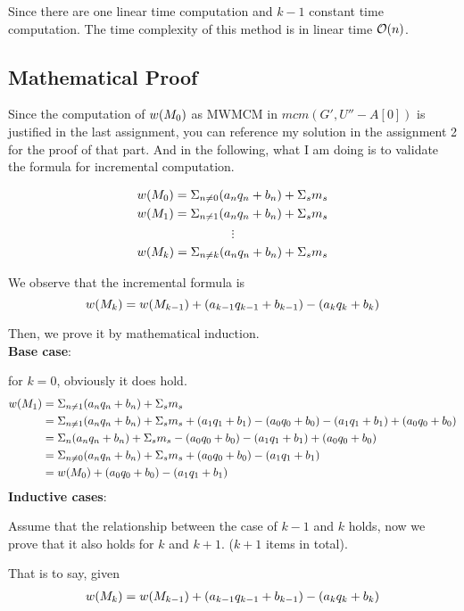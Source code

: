 \documentclass[11pt,a4paper]{article}
\begin{document}
Since there are one linear time computation and $k-1$ constant time
computation. The time complexity of this method is in linear time
$\mathcal{O}(n)$.

\newpage
\subsection{Mathematical Proof}
Since the computation of $w(M_{0})$ as MWMCM in $mcm(G', U''-A[0])$ is justified
in the last assignment, you can reference my solution in the assignment 2 for
the proof of that part. And in the following, what I am doing is to validate
the formula for incremental computation. 

\begin{align*}
    w(M_{0}) = \Sigma_{n \neq 0} (a_n q_n + b_n) + \Sigma_s m_s \\
    w(M_{1}) = \Sigma_{n \neq 1} (a_n q_n + b_n) + \Sigma_s m_s 
\end{align*}
$$
\vdots 
$$
\begin{align*}
    w(M_{k}) = \Sigma_{n \neq k} (a_n q_n + b_n) + \Sigma_s m_s
\end{align*}

We observe that the incremental formula is 
    $$
    w(M_{k}) = w(M_{k-1}) + (a_{k-1} q_{k-1} + b_{k-1}) - (a_{k} q_{k} + b_{k})
    $$

Then, we prove it by mathematical induction. \\[0.5cm]
\textbf{Base case}: 

for $k = 0$, obviously it does hold.
\begin{align*}
    w(M_{1}) &= \Sigma_{n \neq 1} (a_{n} q_{n} + b_{n}) + \Sigma_s m_s \\
           &= \Sigma_{n \neq 1} (a_{n} q_{n} + b_{n}) + \Sigma_s m_s 
    + (a_{1} q_{1} + b_{1}) - (a_{0} q_{0} + b_{0}) - (a_{1} q_{1} + b_{1}) + (a_{0} q_{0} + b_{0}) \\
    &= \Sigma_{n}(a_{n} q_{n} + b_{n}) + \Sigma_s m_s - (a_{0} q_{0} + b_{0}) - (a_{1} q_{1} + b_{1}) + (a_{0} q_{0} + b_{0})  \\
    &= \Sigma_{n \neq 0} (a_{n} q_{n} + b_{n}) + \Sigma_s m_s + (a_{0} q_{0} + b_{0}) - (a_{1} q_{1} + b_{1})  \\
    &= w(M_{0}) + (a_{0} q_{0} + b_{0}) - (a_{1} q_{1} + b_{1}) 
\end{align*}
\textbf{Inductive cases}: 

Assume that the relationship between the case of
$k-1$ and $k$ holds, now we prove that it also holds for $k$ and $k+1$. ($k+1$
items in total).  

That is to say, given
\begin{align*}
    w(M_{k}) = w(M_{k-1}) + (a_{k-1} q_{k-1} + b_{k-1}) - (a_{k} q_{k} + b_{k})
\end{align*}
\end{document}
